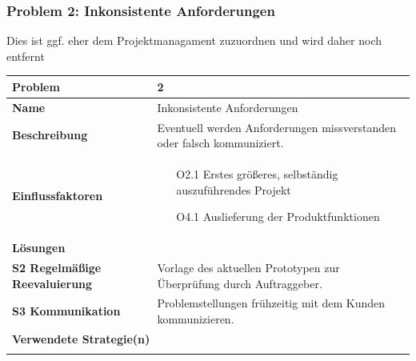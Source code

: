 \documentclass[fontsize=12pt,paper=a4,twoside]{scrartcl}
\begin{document}
\subsubsection{Problem 2: Inkonsistente Anforderungen}
\huge
Dies ist ggf. eher dem Projektmanagament zuzuordnen und wird daher noch entfernt
\normalsize
\begin{tabularx}{\textwidth}{|p{6cm}|X|}
 \hline
 \textbf{Problem} & 2 \\\hline
 \textbf{Name} & Inkonsistente Anforderungen\\\hline 
 \textbf{Beschreibung} & Eventuell werden Anforderungen missverstanden oder falsch kommuniziert.\\\hline
 \textbf{Einflussfaktoren} &
 \begin{itemize}
 \item[O2.1] Erstes größeres, selbständig auszuführendes Projekt
 \item[O4.1] Auslieferung der Produktfunktionen
 \end{itemize}\\\hline
\multicolumn{2}{|l|}{\textbf{Lösungen}} \\\hline

\textbf{S2 Regelmäßige Reevaluierung} & Vorlage des aktuellen Prototypen zur Überprüfung durch Auftraggeber. \\
\textbf{S3 Kommunikation} & Problemstellungen frühzeitig mit dem Kunden kommunizieren. \\\hline
 
\multicolumn{2}{|l|}{\textbf{Verwendete Strategie(n)}} \\\hline
    & \\\hline

\end{tabularx}
\newpage
\end{document}
